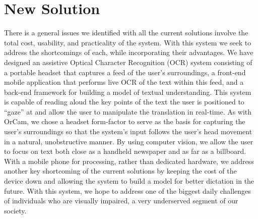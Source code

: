 \section{New Solution}

There is a general issues we identified with all the current solutions involve the total cost, usability, and practicality of the system. With this system we seek to address the shortcomings of each, while incorporating their advantages. We have designed an assistive Optical Character Recognition (OCR) system consisting of a portable headset that captures a feed of the user's surroundings, a front-end mobile application that performs live OCR of the text within this feed, and a back-end framework for building a model of textual understanding. This system is capable of reading aloud the key points of the text the user is positioned to “gaze” at and allow the user to manipulate the translation in real-time. As with OrCam, we chose a headset form-factor to serve as the basis for capturing the user's surroundings so that the system's input follows the user's head movement in a natural, unobstructive manner. By using computer vision, we allow the user to focus on text both close as a handheld newspaper and as far as a billboard. With a mobile phone for processing, rather than dedicated hardware, we address another key shortcoming of the current solutions by keeping the cost of the device down and allowing the system to build a model for better dictation in the future. With this system, we hope to address one of the biggest daily challenges of individuals who are visually impaired, a very underserved segment of our society.